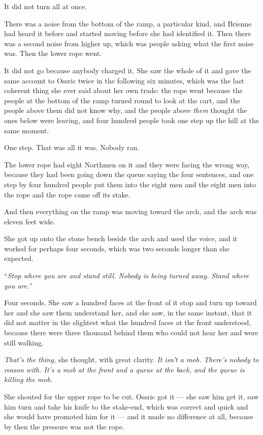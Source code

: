 \sceneBreak

It did not turn all at once.

There was a noise from the bottom of the ramp, a particular kind, and Brienne had heard it before and started moving before she had identified it. Then there was a second noise from higher up, which was people asking what the first noise was. Then the lower rope went.

It did not go because anybody charged it. She saw the whole of it and gave the same account to Ossric twice in the following six minutes, which was the last coherent thing she ever said about her own trade: the rope went because the people at the bottom of the ramp turned round to look at the cart, and the people above them did not know why, and the people above \textit{them} thought the ones below were leaving, and four hundred people took one step up the hill at the same moment.

One step. That was all it was. Nobody ran.

The lower rope had eight Northmen on it and they were facing the wrong way, because they had been going down the queue saying the four sentences, and one step by four hundred people put them into the eight men and the eight men into the rope and the rope came off its stake.

And then everything on the ramp was moving toward the arch, and the arch was eleven feet wide.

\sceneBreak

She got up onto the stone bench beside the arch and used the voice, and it worked for perhaps four seconds, which was two seconds longer than she expected.

“\textit{Stop where you are and stand still. Nobody is being turned away. Stand where you are.}”

Four seconds. She saw a hundred faces at the front of it stop and turn up toward her and she saw them understand her, and she saw, in the same instant, that it did not matter in the slightest what the hundred faces at the front understood, because there were three thousand behind them who could not hear her and were still walking.

\textit{That’s the thing,} she thought, with great clarity. \textit{It isn’t a mob. There’s nobody to reason with. It’s a mob at the front and a queue at the back, and the queue is killing the mob.}

She shouted for the upper rope to be cut. Ossric got it — she saw him get it, saw him turn and take his knife to the stake-end, which was correct and quick and she would have promoted him for it — and it made no difference at all, because by then the pressure was not the rope.

